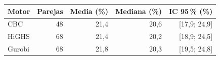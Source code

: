 \begin{tabular}{lrrrr}\toprule
Motor & Parejas & Media (\%) & Mediana (\%) & IC 95\,\% (\%) \\
\midrule
CBC & 48 & 21,4 & 20,6 & [17,9; 24,9] \\
HiGHS & 68 & 21,4 & 20,2 & [18,9; 24,5] \\
Gurobi & 68 & 21,8 & 20,3 & [19,5; 24,8] \\
\bottomrule\end{tabular}
